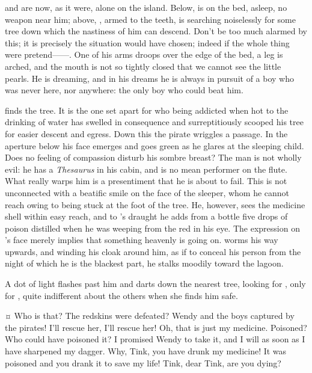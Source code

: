 \begin{drama}
{\hook and \peter are now, as it were, alone on the island.
Below, \peter is on the bed, asleep, no weapon near him;
above, \hook, armed to the teeth, is searching noiselessly for some tree down which the nastiness of him can descend.
Don't be too much alarmed by this; it is precisely the situation \peter would have chosen;
indeed if the whole thing were pretend——.
One of his arms droops over the edge of the bed, a leg is arched,
and the mouth is not so tightly closed that we cannot see the little pearls.
He is dreaming, and in his dreams he is always in pursuit of a boy who was never here, nor anywhere:
the only boy who could beat him.

\hook finds the tree.
It is the one set apart for \slightly who being addicted when hot to the drinking of water has swelled in consequence
and surreptitiously scooped his tree for easier descent and egress.
Down this the pirate wriggles a passage.
In the aperture below his face emerges and goes green as he glares at the sleeping child.
Does no feeling of compassion disturb his sombre breast?
The man is not wholly evil: he has a \emph{Thesaurus} in his cabin, and is no mean performer on the flute.
What really warps him is a presentiment that he is about to fail.
This is not unconnected with a beatific smile on the face of the sleeper,
whom he cannot reach owing to being stuck at the foot of the tree.
He, however, sees the medicine shell within easy reach,
and to \wendy's draught he adds from a bottle five drops of poison
distilled when he was weeping from the red in his eye.
The expression on \peter's face merely implies that something heavenly is going on.
\hook worms his way upwards, and winding his cloak around him,
as if to conceal his person from the night of which he is the blackest part,
he stalks moodily toward the lagoon.

A dot of light flashes past him and darts down the nearest tree, looking for \peter, only for \peter,
quite indifferent about the others when she finds him safe.}

\peterspeaks {}¤
Who is that?
The redskins were defeated?
Wendy and the boys captured by the pirates!
I'll rescue her, I'll rescue her!
Oh, that is just my medicine.
Poisoned?
Who could have poisoned it?
I promised Wendy to take it, and I will as soon as I have sharpened my dagger.
Why, Tink, you have drunk my medicine!
It was poisoned and you drank it to save my life!
Tink, dear Tink, are you dying?


\end{drama}
